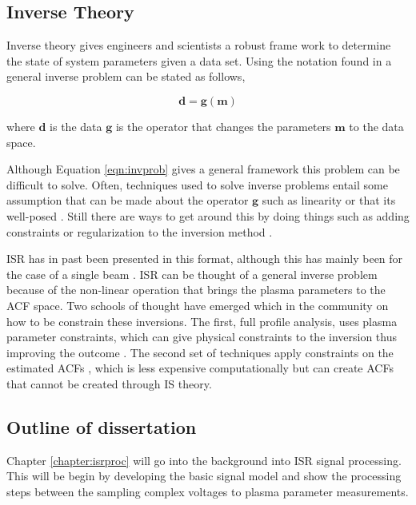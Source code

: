 \subsection{Inverse Theory}
Inverse theory gives engineers and scientists a robust frame work to determine the state of system parameters given a data set. Using the notation found in \cite{menke2012geophysical} a general inverse problem can be stated as follows,

\begin{equation}
\label{eqn:invprob}
\mathbf{d}=\mathbf{g}(\mathbf{m})
\end{equation}

\noindent where $\mathbf{d}$ is the data $\mathbf{g}$ is the operator that changes the parameters $\mathbf{m}$ to the data space. 

Although Equation \ref{eqn:invprob} gives a general framework this problem can be difficult to solve. Often, techniques used to solve inverse problems entail some assumption that can be made about the operator $\mathbf{g}$ such as linearity or that its well-posed \cite{0266-5611-4-4-010}. Still there are ways to get around this by doing things such as adding constraints or regularization to the inversion method \cite{Vogel:2002:CMI:581830}.

ISR has in past been presented in this format, although this has mainly been for the case of a single beam \cite{Vierinen:2012ve}. ISR can be thought of a general inverse problem because of the non-linear operation that brings the plasma parameters to the ACF space. Two schools of thought have emerged which in the community on how to be constrain these inversions. The first, full profile analysis, uses plasma parameter constraints, which can give physical constraints to the inversion thus improving the outcome \cite{hysell2008,RDS:RDS3308}. The second set of techniques apply constraints on the estimated ACFs \cite{Virtanen:20082vx,nikoukar2008}, which is less expensive computationally but can create ACFs that cannot be created through IS theory.

\subsection{Outline of dissertation}

Chapter \ref{chapter:isrproc} will go into the background into ISR signal processing. This will be begin by developing the basic signal model and show the processing steps between the sampling complex voltages to plasma parameter measurements.

